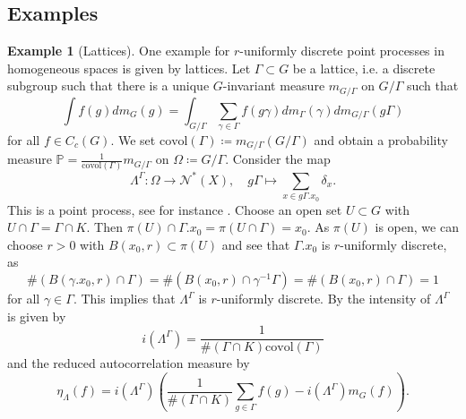 \documentclass[12pt,reqno,a4paper]{amsart}
\theoremstyle{theorem}
\theoremstyle{definition}
\newtheorem{example}[theorem]{Example}
\numberwithin{theorem}{section}
\numberwithin{equation}{section}
\begin{document}
\subsection{Examples}\label{s:Examples}
\begin{example}[Lattices]
One example for $r$-uniformly discrete point processes in homogeneous spaces is given by lattices.
Let $\Gamma\subset G$ be a lattice, i.e. a discrete subgroup such that there is a unique $G$-invariant measure $m_{G/\Gamma}$ on $G/\Gamma$ such that 
\[\int f(g)dm_G(g) = \int_{G/\Gamma} \sum_{\gamma\in \Gamma}f(g\gamma)dm_\Gamma(\gamma)dm_{G/\Gamma}(g\Gamma)\]
for all $f\in C_c(G)$. We set $\mathrm{covol}(\Gamma)\coloneqq m_{G/\Gamma}(G/\Gamma)$ and 
obtain a probability measure $\mathbb{P}=\frac{1}{\mathrm{covol}(\Gamma)}m_{G/\Gamma}$ on $\Omega\coloneqq G/\Gamma$. Consider the map
\[\Lambda^\Gamma:\Omega\to \mathcal{N}^*(X),\quad g\Gamma\mapsto \sum_{x\in g\Gamma.x_0}\delta_x.\]
This is a point process, see for instance \cite[Example 2.2]{MichaelMattiasArXiv}.
Choose an open set $U\subset G$ with $U\cap \Gamma = \Gamma\cap K$. Then $\pi(U)\cap \Gamma.x_0 = \pi(U\cap \Gamma) = x_0$. As $\pi(U)$ is open, we can choose $r>0$ with $B(x_0,r)\subset \pi(U)$ and see that $\Gamma.x_0$ is $r$-uniformly discrete, as
\[
\#(B(\gamma.x_0,r)\cap \Gamma) = \#(B(x_0,r)\cap \gamma^{-1}\Gamma) = \#(B(x_0,r)\cap \Gamma) = 1
\]
for all $\gamma\in \Gamma$.
This implies that $\Lambda^\Gamma$ is $r$-uniformly discrete.
By \cite[Example 2.5]{MichaelMattiasArXiv} the intensity of $\Lambda^\Gamma$ is given by 
\[i(\Lambda^\Gamma) = \frac{1}{\#(\Gamma\cap K)\mathrm{covol}(\Gamma)}\]
and the reduced autocorrelation measure by
\[\eta_\Lambda(f)=i(\Lambda^\Gamma)\left(\frac{1}{\#(\Gamma\cap K)}\sum_{g\in\Gamma}f(g)- i(\Lambda^\Gamma)m_G(f)\right).\]
\end{example}
\end{document}
